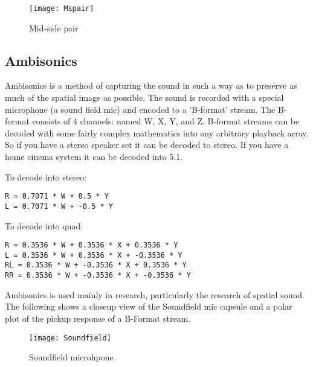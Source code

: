 \begin{figure}[H]
\centering
\texttt{[image: Mspair]}\caption{Mid-side pair}
\label{fig:midsidepair}
\end{figure}


\subsection{Ambisonics}
Ambisonics is a method of capturing the sound in such a way as to preserve as much of the spatial image as possible. The sound is recorded with a special microphone (a sound field mic) and encoded to a 'B-format' stream. The B-format consists of 4 channels: named W, X, Y, and Z. B-format streams can be decoded with some fairly complex mathematics into any arbitrary playback array. So if you have a stereo speaker set it can be decoded to stereo. If you have a home cinema system it can be decoded into 5.1.

To decode into stereo:
\begin{verbatim} 
R = 0.7071 * W + 0.5 * Y
L = 0.7071 * W + -0.5 * Y
\end{verbatim}

To decode into quad:
\begin{verbatim}
R = 0.3536 * W + 0.3536 * X + 0.3536 * Y
L = 0.3536 * W + 0.3536 * X + -0.3536 * Y
RL = 0.3536 * W + -0.3536 * X + 0.3536 * Y
RR = 0.3536 * W + -0.3536 * X + -0.3536 * Y
\end{verbatim}

Ambisonics is used mainly in research, particularly the research of spatial sound. The following shows a closeup view of the Soundfield mic capsule and a polar plot of the pickup response of a B-Format stream.


\begin{figure}[H]
\centering
\texttt{[image: Soundfield]}\caption{Soundfield microhpone}
\label{fig:soundfield}
\end{figure}

\begin{comment}

\begin{figure}[H]
\centering
\texttt{[image: usssinputoutput]}\caption{ussstools input output and sfplay}
\label{fig:usssinputoutput}
\end{figure}

\end{comment}
